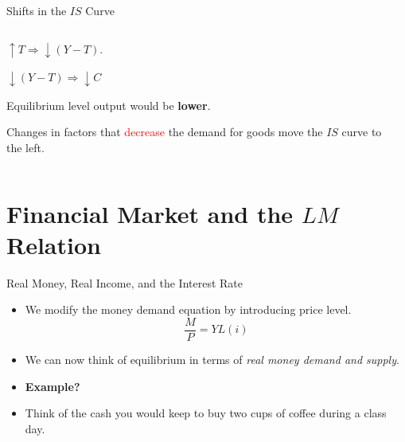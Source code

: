 \documentclass[shownotes,11pt, aspectratio=169]{beamer}
\newenvironment{wideitemize}{\itemize\addtolength{\itemsep}{10pt}}{\enditemize}
\begin{document}
\begin{frame}{Shifts in the $IS$ Curve}
\begin{columns}[T] %
\begin{column}{.44\textwidth}
  \begin{wideitemize}
    \item $\uparrow T \Rightarrow \downarrow (Y - T)$.
    \item $\downarrow (Y - T) \Rightarrow \downarrow C$
    \pause
    \item Equilibrium level output would be \textbf{lower}.
    \pause
    \item Changes in factors that \textcolor{red}{decrease} the demand for goods move the $IS$ curve to the left.
  \end{wideitemize}
\end{column}%
\pause
\hfill%
\begin{column}{0.53\textwidth}
\end{column}%
\end{columns}
\end{frame}

\section{Financial Market and the $LM$ Relation}
\begin{frame}{Real Money, Real Income, and the Interest Rate}
\begin{itemize}
\item We modify the money demand equation by introducing price level.
    \[ \frac{M}{P} = YL(i) \]
\item We can now think of equilibrium in terms of \textit{real money demand and supply}.
\item \textbf{Example?}
\pause
\item Think of the cash you would keep to buy two cups of coffee during a class day.
\end{itemize}
\end{frame}
\end{document}
